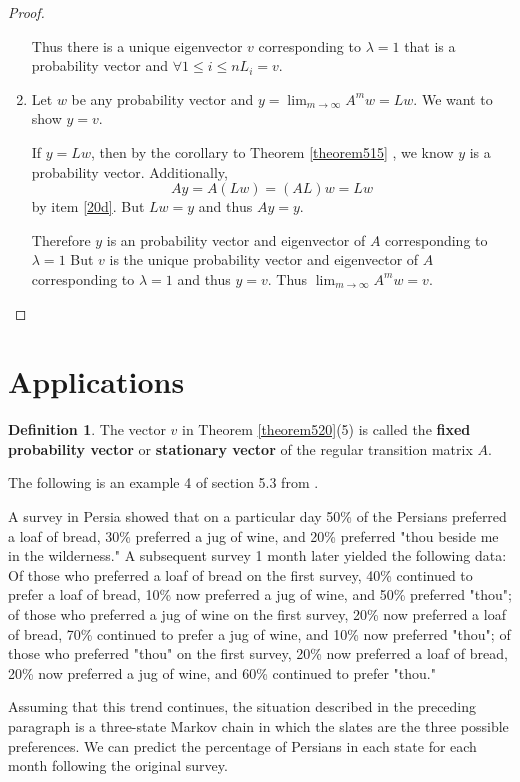 \documentclass{amsart}
\theoremstyle{definition}
\newtheorem{definition}[thm]{Definition}
\theoremstyle{remark}
\numberwithin{equation}{section}
\begin{document}
\begin{proof}
\begin{enumerate}
			Thus there is a unique eigenvector $v$ corresponding to $\lambda = 1$ that is a probability vector and $\forall 1 \leq i \leq n L_i = v$.

	\item \label{20f}
		Let $w$ be any probability vector and $y = \lim_{m \to \infty} A^m w  = Lw$.
		We want to show $y = v$.
		
		If $y = Lw$, then by the corollary to Theorem \ref{theorem515} , we know $y$ is a probability vector.
		Additionally,
		$$Ay = A(Lw) = (AL)w = Lw$$
		by item \ref{20d}.
		But $Lw = y$ and thus $Ay = y$.

		Therefore $y$ is an probability vector and eigenvector of $A$ corresponding to $\lambda = 1$
		But $v$ is the unique probability vector and eigenvector of $A$ corresponding to $\lambda = 1$ and thus $y = v$.
		Thus $\lim_{m \to \infty} A^m w = v$.


\end{enumerate}


\end{proof}

\section{Applications}

\begin{definition}
The vector $v$ in Theorem \ref{theorem520}(5) is called the \textbf{fixed probability vector} or \textbf{stationary vector} of the regular transition matrix $A$.

\end{definition}

The following is an example 4 of section 5.3 from \cite{friedberg2003linear}.

\begin{displayquote}
	A survey in Persia showed that on a particular day 50\% of the Persians preferred a loaf of bread, 30\% preferred a jug of wine, and 20\% preferred "thou beside me in the wilderness." 
	A subsequent survey 1 month later yielded the following data: Of those who preferred a loaf of bread on the first survey, 40\% continued to prefer a loaf of bread, 10\% now preferred a jug of wine, and 50\% preferred "thou"; of those who preferred a jug of wine on the first survey, 20\% now preferred a loaf of bread, 70\% continued to prefer a jug of wine, and 10\% now preferred "thou"; of those who preferred "thou" on the first survey, 20\% now preferred a loaf of bread, 20\% now preferred a jug of wine, and 60\% continued to prefer "thou."

	Assuming that this trend continues, the situation described in the preceding paragraph is a three-state Markov chain in which the slates are the three possible preferences. We can predict the percentage of Persians in each state for each month following the original survey. 
\end{displayquote}
\end{document}
